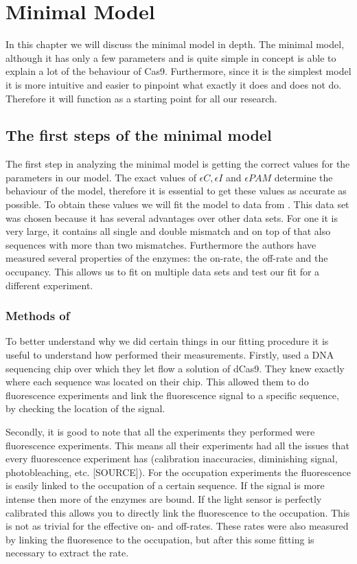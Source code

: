 \chapter{Minimal Model}

In this chapter we will discuss the minimal model in depth. The minimal model, although it has only a few parameters and is quite simple in concept is able to explain a lot of the behaviour of Cas9. Furthermore, since it is the simplest model it is more intuitive and easier to pinpoint what exactly it does and does not do. Therefore it will function as a starting point for all our research.

\section{The first steps of the minimal model}

The first step in analyzing the minimal model is getting the correct values for the parameters in our model. The exact values of $\epsilon C, \epsilon I$ and $\epsilon PAM$ determine the behaviour of the model, therefore it is essential to get these values as accurate as possible. To obtain these values we will fit the model to data from \cite{PNAS}. This data set was chosen because it has several advantages over other data sets. For one it is very large, it contains all single and double mismatch and on top of that also sequences with more than two mismatches. Furthermore the authors have measured several properties of the enzymes: the on-rate, the off-rate and the occupancy. This allows us to fit on multiple data sets and test our fit for a different experiment.

\subsection{Methods of \cite{PNAS}}

To better understand why we did certain things in our fitting procedure it is useful to understand how \citep{PNAS} performed their measurements. Firstly, \cite{PNAS} used a DNA sequencing chip over which they let flow a solution of dCas9. %
They knew exactly where each sequence was located on their chip. This allowed them to do fluorescence experiments and link the fluorescence signal to a specific sequence, by checking the location of the signal.

Secondly, it is good to note that all the experiments they performed were fluorescence experiments. This means all their experiments had all the issues that every fluorescence experiment has (calibration inaccuracies, diminishing signal, photobleaching, etc. [SOURCE]). For the occupation experiments the fluorescence is easily linked to the occupation of a certain sequence. If the signal is more intense then more of the enzymes are bound. If the light sensor is perfectly calibrated this allows you to directly link the fluorescence to the occupation. This is not as trivial for the effective on- and off-rates. These rates were also measured by linking the fluoresence to the occupation, but after this some fitting is necessary to extract the rate.

